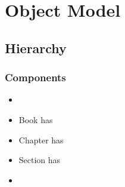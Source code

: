 \section{Object Model}


\subsection{Hierarchy}
\begin{frame}
	\frametitle{Components}
	\begin{itemize}
		\item {}
		\item Book has 
		\item Chapter has 
		\item Section has 
		\item {}
	\end{itemize}
\end{frame}


